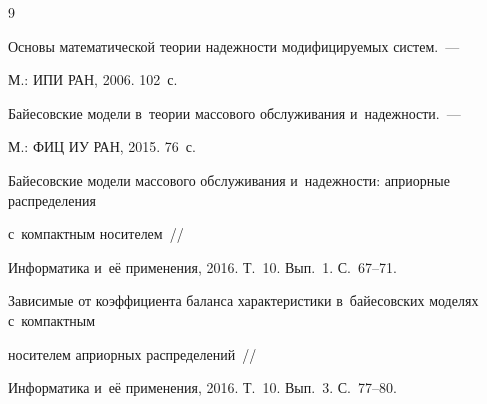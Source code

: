 {\small\frenchspacing


{%




\begin{thebibliography}{9}

















Основы математической теории надежности модифицируемых систем.~--- 


М.: ИПИ РАН, 2006. 102~с.





















Байесовские модели в~теории массового обслуживания и~надежности.~--- 


М.: ФИЦ ИУ РАН, 2015. 76~с.









Байесовские модели массового обслуживания и~надежности: априорные распределения 


с~компактным носителем~/\!\!/


Информатика и~её применения, 2016. Т.~10. Вып.~1. С.~67--71.









Зависимые от коэффициента баланса характеристики в~байесовских моделях с~компактным 


носителем априорных распределений~/\!\!/


Информатика и~её применения, 2016. Т.~10. Вып.~3. С.~77--80.












\end{thebibliography}}}
